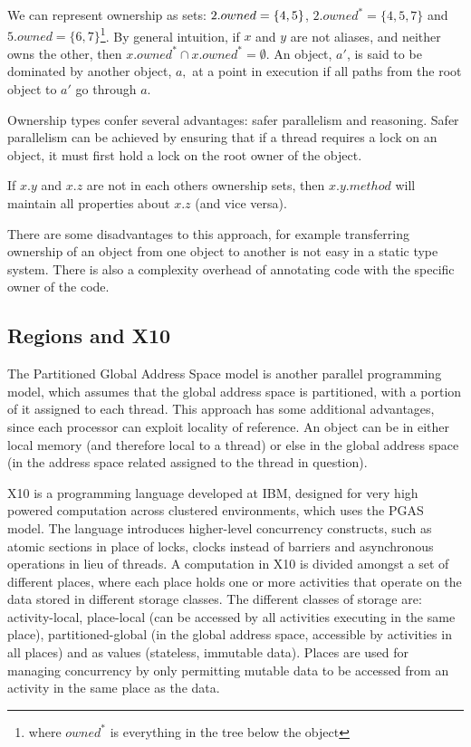 \documentclass[11pt,a4paper]{report}
\begin{document}
We can represent ownership as sets:
$\/2.owned=\{4,5\}$, $2.owned^{*}=\{4,5,7\}$ and $5.owned=\{6,7\}$\footnote{where $owned^{*}$ is everything in the tree below the object}.
By general intuition, if $x$ and $y$ are not aliases, and neither owns the other, then $x.owned^{*} \cap x.owned^{*} = \emptyset$.
An object, $a'$, is said to be dominated by another object, $a,$ at a point in execution if all paths from the root object to $a'$ go through $a$.

Ownership types confer several advantages: safer parallelism and reasoning.
Safer parallelism\cite{boyapati2002ownership} can be achieved by ensuring that if a thread requires a lock on an object, it must first hold a lock on the root owner of the object.

If $x.y$ and $x.z$ are not in each others ownership sets, then $x.y.method$ will maintain
all properties about $x.z$ (and vice versa).

There are some disadvantages to this approach, for example transferring ownership of an object from one object to another is not easy in a static type system\cite{clarke1998}.
There is also a complexity overhead of annotating code with the specific owner of the code.

\subsection{Regions and X10}
\label{sec:regions}

The Partitioned Global Address Space model\cite{pgas} is another parallel programming model, which assumes that the global address space is partitioned, with a portion of it assigned to each thread.
This approach has some additional advantages, since each processor can exploit locality of reference.
An object can be in either local memory (and therefore local to a thread) or else in the global address space (in the address space related assigned to the thread in question).

X10\cite{x10} is a programming language developed at IBM, designed for very high powered computation across clustered environments, which uses the PGAS model.
The language introduces higher-level concurrency constructs, such as atomic sections in place of locks, clocks instead of barriers and asynchronous operations in lieu of threads.
A computation in X10 is divided amongst a set of different places, where each place holds one or more activities that operate on the data stored in different storage classes.
The different classes of storage are: activity-local, place-local (can be accessed by all activities executing in the same place), partitioned-global (in the global address space, accessible by activities in all places) and as values (stateless, immutable data)\cite{x10-places}.
Places are used for managing concurrency by only permitting mutable data to be accessed from an activity in the same place as the data\cite{charles2005x10}.
\end{document}
